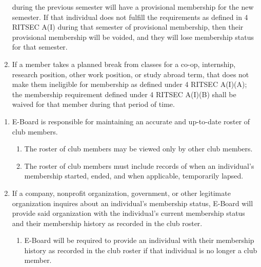 \begin{enumerate}
	      during the previous semester will have a provisional membership for the new
	      semester. If that individual does not fulfill the requirements as defined in 4
	      RITSEC A(I) during that semester of provisional membership, then their
	      provisional membership will be voided, and they will lose membership status for
	      that semester.
	\item If a member takes a planned break from classes for a co-op, internship,
	      research position, other work position, or study abroad term, that does not
	      make them ineligible for membership as defined under 4 RITSEC A(I)(A); the
	      membership requirement defined under 4 RITSEC A(I)(B) shall be waived for that
	      member during that period of time.
\end{enumerate}


\begin{enumerate}
	\item E-Board is responsible for maintaining an accurate and up-to-date roster of
	      club members.
	      \begin{enumerate}
		      \item The roster of club members may be viewed only by other club members.
		      \item The roster of club members must include records of when an individual's
		            membership started, ended, and when applicable, temporarily lapsed.
	      \end{enumerate}
	\item If a company, nonprofit organization, government, or other legitimate
	      organization inquires about an individual's membership status, E-Board will
	      provide said organization with the individual's current membership status and
	      their membership history as recorded in the club roster.
	      \begin{enumerate}
		      \item E-Board will be required to provide an individual with their membership history
		            as recorded in the club roster if that individual is no longer a club member.
	      \end{enumerate}
\end{enumerate}
